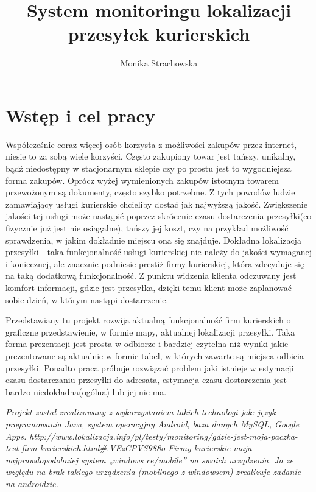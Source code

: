 \documentclass[eng,printmode,oneside]{mgr}
\title{System monitoringu lokalizacji przesyłek kurierskich}
\author{Monika Strachowska}
\begin{document}

\maketitle %


\tableofcontents %

\chapter{Wstęp i cel pracy}

Współcześnie coraz więcej osób korzysta z możliwości zakupów przez internet,
niesie to za sobą wiele korzyści. Często zakupiony towar jest tańszy, unikalny,
bądź niedostępny w stacjonarnym sklepie czy po prostu jest to wygodniejsza forma
zakupów. Oprócz wyżej wymienionych zakupów istotnym towarem przewożonym
są dokumenty, często szybko potrzebne. Z tych powodów ludzie zamawiający usługi 
kurierskie chcieliby dostać jak najwyższą jakość. Zwiększenie jakości tej
usługi może nastąpić poprzez skrócenie czasu dostarczenia przesyłki(co
fizycznie już jest nie osiągalne), tańszy jej koszt, czy na przykład możliwość
sprawdzenia, w jakim dokładnie miejscu ona się znajduje. Dokładna lokalizacja
przesyłki - taka funkcjonalność usługi kurierskiej nie należy do jakości
wymaganej i koniecznej, ale znacznie podniesie prestiż firmy
kurierskiej, która zdecyduje się na taką dodatkową funkcjonalność. Z punktu
widzenia klienta odczuwany jest komfort informacji, gdzie jest przesyłka, dzięki
temu klient może zaplanować sobie dzień, w którym nastąpi dostarczenie. 

Przedstawiany tu projekt rozwija aktualną funkcjonalność firm kurierskich o
graficzne przedstawienie, w formie mapy, aktualnej lokalizacji przesyłki. Taka
forma prezentacji jest prosta w odbiorze i bardziej czytelna niż wyniki
jakie prezentowane są aktualnie w formie tabel, w których zawarte są miejsca
odbicia przesyłki. Ponadto praca próbuje rozwiązać problem jaki istnieje w
estymacji czasu dostarczaniu przesyłki do adresata, estymacja czasu
dostarczenia jest bardzo niedokładna(ogólna) lub jej nie ma.

\emph{\color{komentarz}
Projekt został zrealizowany z wykorzystaniem takich
technologi jak:
język programowania Java, system operacyjny Android, baza danych MySQL, Google Apps.
http://www.lokalizacja.info/pl/testy/monitoring/gdzie-jest-moja-paczka-test-firm-kurierskich.html\#.VEzCPVS988o
Firmy kurierskie maja najprawdopodobniej system „windows ce/mobile” na swoich urządzenia. Ja ze względu na brak takiego urządzenia (mobilnego z windowsem) 
zrealizuje zadanie na androidzie.
}
\end{document}

